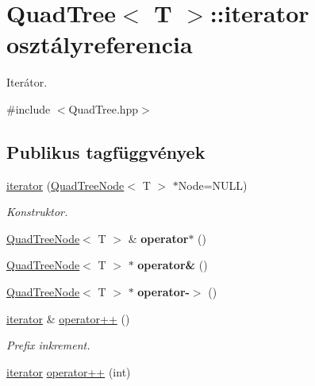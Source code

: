 \hypertarget{class_quad_tree_1_1iterator}{\section{Quad\-Tree$<$ T $>$\-:\-:iterator osztályreferencia}
\label{class_quad_tree_1_1iterator}
}


Iterátor.  




{\ttfamily \#include $<$Quad\-Tree.\-hpp$>$}

\subsection*{Publikus tagfüggvények}
\begin{DoxyCompactItemize}
\item 
\hypertarget{class_quad_tree_1_1iterator_a350d107e2c731c4d6c48bb1d9b55db44}{\hyperlink{class_quad_tree_1_1iterator_a350d107e2c731c4d6c48bb1d9b55db44}{iterator} (\hyperlink{class_quad_tree_node}{Quad\-Tree\-Node}$<$ T $>$ $\ast$Node=N\-U\-L\-L)}\label{class_quad_tree_1_1iterator_a350d107e2c731c4d6c48bb1d9b55db44}

\begin{DoxyCompactList}\small\item\em Konstruktor. \end{DoxyCompactList}\item 
\hypertarget{class_quad_tree_1_1iterator_a8a17ddd1067466f5c8a7f0cd65e57c4a}{\hyperlink{class_quad_tree_node}{Quad\-Tree\-Node}$<$ T $>$ \& {\bfseries operator$\ast$} ()}\label{class_quad_tree_1_1iterator_a8a17ddd1067466f5c8a7f0cd65e57c4a}

\item 
\hypertarget{class_quad_tree_1_1iterator_a40a7df8c079625c3ad454422d9abd8c3}{\hyperlink{class_quad_tree_node}{Quad\-Tree\-Node}$<$ T $>$ $\ast$ {\bfseries operator\&} ()}\label{class_quad_tree_1_1iterator_a40a7df8c079625c3ad454422d9abd8c3}

\item 
\hypertarget{class_quad_tree_1_1iterator_a12900f2e237588e0fd78eafb6c009364}{\hyperlink{class_quad_tree_node}{Quad\-Tree\-Node}$<$ T $>$ $\ast$ {\bfseries operator-\/$>$} ()}\label{class_quad_tree_1_1iterator_a12900f2e237588e0fd78eafb6c009364}

\item 
\hyperlink{class_quad_tree_1_1iterator}{iterator} \& \hyperlink{class_quad_tree_1_1iterator_a94a8a729d88aa6ec105d748ac9a5d14e}{operator++} ()
\begin{DoxyCompactList}\small\item\em Prefix inkrement. \end{DoxyCompactList}\item 
\hypertarget{class_quad_tree_1_1iterator_a191a4cc5febf9c0c313f52770332f712}{\hyperlink{class_quad_tree_1_1iterator}{iterator} \hyperlink{class_quad_tree_1_1iterator_a191a4cc5febf9c0c313f52770332f712}{operator++} (int)}\label{class_quad_tree_1_1iterator_a191a4cc5febf9c0c313f52770332f712}


\end{DoxyCompactItemize}
